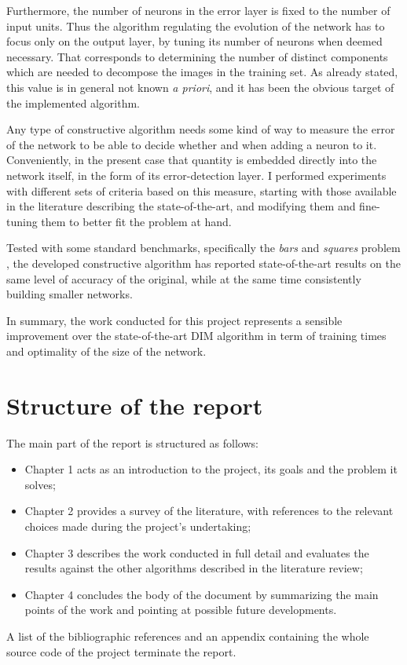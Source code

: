 \documentclass[11pt,a4paper]{report}
\begin{document}
		Furthermore, the number of neurons in the error layer is fixed to the number of input units. Thus the algorithm regulating the evolution of the network has to focus only on the output layer, by tuning its number of neurons when deemed necessary. That corresponds to determining the number of distinct components which are needed to decompose the images in the training set. As already stated, this value is in general not known \emph{a priori}, and it has been the obvious target of the implemented algorithm.
		
		Any type of constructive algorithm needs some kind of way to measure the error of the network to be able to decide whether and when adding a neuron to it. Conveniently, in the present case that quantity is embedded directly into the network itself, in the form of its error-detection layer. I performed experiments with different sets of criteria based on this measure, starting with those available in the literature describing the state-of-the-art, and modifying them and fine-tuning them to better fit the problem at hand.
		
		Tested with some standard benchmarks, specifically the \emph{bars} \cite{spratling2012unsupervised} and \emph{squares} problem \cite{spratling2009unsupervised}, the developed constructive algorithm has reported state-of-the-art results on the same level of accuracy of the original, while at the same time consistently building smaller networks.
		
		In summary, the work conducted for this project represents a sensible improvement over the
		state-of-the-art DIM algorithm in term of training times and optimality of the size of the network.

		\section{Structure of the report}
		The main part of the report is structured as follows:
		\begin{itemize}
			\item Chapter 1 acts as an introduction to the project, its goals and the problem it solves;
			\item Chapter 2 provides a survey of the literature, with references to the relevant choices made during the project's undertaking;
			\item Chapter 3 describes the work conducted in full detail and evaluates the results against the other algorithms described in the literature review;
			\item Chapter 4 concludes the body of the document by summarizing the main points of the work and pointing at possible future developments.
		\end{itemize}
		A list of the bibliographic references and an appendix containing the whole source code of the project terminate the report.
	
\end{document}
